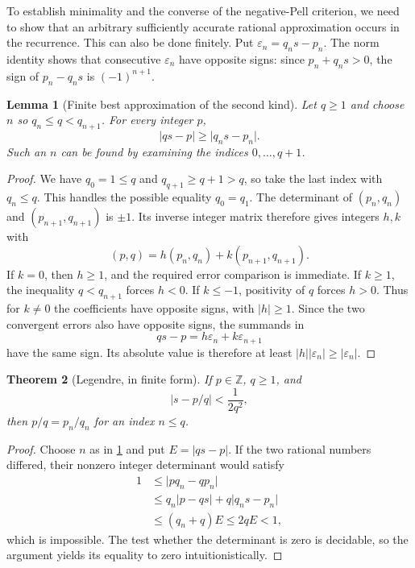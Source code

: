 \documentclass[11pt,letterpaper]{article}
\newtheorem{theorem}{Theorem}[section]
\newtheorem{lemma}[theorem]{Lemma}
\theoremstyle{definition}
\newcommand{\Z}{\mathbb Z}
\newcommand{\abs}[1]{\lvert#1\rvert}
\begin{document}
To establish minimality and the converse of the negative-Pell criterion,
we need to show that an arbitrary sufficiently accurate rational
approximation occurs in the recurrence. This can also be done finitely.
Put $\varepsilon_n=q_ns-p_n$. The norm identity shows that consecutive
$\varepsilon_n$ have opposite signs: since $p_n+q_ns>0$, the sign of
$p_n-q_ns$ is $(-1)^{n+1}$.

\begin{lemma}[Finite best approximation of the second kind]\label{lem:bestsecond}
Let $q\ge1$ and choose $n$ so $q_n\le q<q_{n+1}$.
For every integer $p$,
\[
 \abs{qs-p}\ge\abs{q_ns-p_n}.
\]
Such an $n$ can be found by examining the indices $0,\ldots,q+1$.
\end{lemma}
\begin{proof}
We have $q_0=1\le q$ and $q_{q+1}\ge q+1>q$, so take the last index
with $q_n\le q$. This handles the possible equality $q_0=q_1$.
The determinant of $(p_n,q_n)$ and $(p_{n+1},q_{n+1})$ is $\pm1$.
Its inverse integer matrix therefore gives integers $h,k$ with
\[
 (p,q)=h(p_n,q_n)+k(p_{n+1},q_{n+1}).
\]
If $k=0$, then $h\ge1$, and the required error comparison is immediate.
If $k\ge1$, the inequality $q<q_{n+1}$ forces $h<0$.
If $k\le-1$, positivity of $q$ forces $h>0$.
Thus for $k\ne0$ the coefficients have opposite signs, with $\abs h\ge1$.
Since the two convergent errors also have opposite signs, the summands in
\[
 qs-p=h\varepsilon_n+k\varepsilon_{n+1}
\]
have the same sign. Its absolute value is therefore at least
$\abs h\abs{\varepsilon_n}\ge\abs{\varepsilon_n}$.
\end{proof}

\begin{theorem}[Legendre, in finite form]\label{thm:legendre}
If $p\in\Z$, $q\ge1$, and
\[
 \abs{s-p/q}<\frac1{2q^2},
\]
then $p/q=p_n/q_n$ for an index $n\le q$.
\end{theorem}
\begin{proof}
Choose $n$ as in \cref{lem:bestsecond} and put $E=\abs{qs-p}$.
If the two rational numbers differed, their nonzero integer determinant
would satisfy
\[
\begin{aligned}
 1&\le\abs{pq_n-qp_n}\\
  &\le q_n\abs{p-qs}+q\abs{q_ns-p_n}\\
  &\le(q_n+q)E\le2qE<1,
\end{aligned}
\]
which is impossible. The test whether the determinant is zero is decidable,
so the argument yields its equality to zero intuitionistically.
\end{proof}
\end{document}
